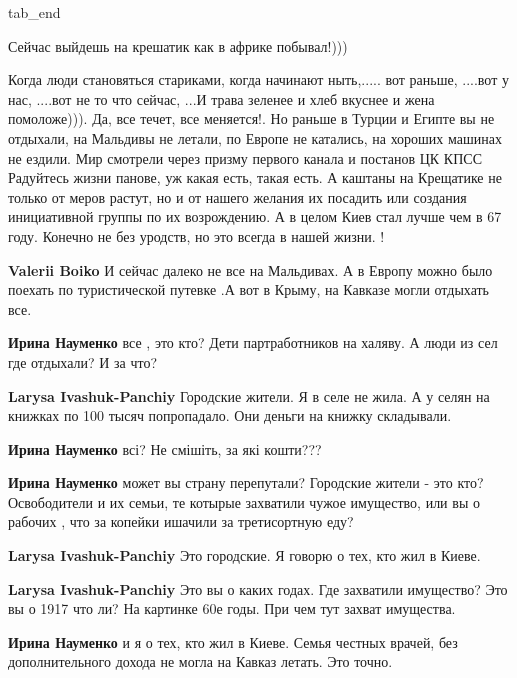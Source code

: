 \begin{itemize}
  tab_end
\fi

Сейчас выйдешь на крешатик как в африке побывал!)))


Когда люди становяться стариками, когда начинают ныть,..... вот раньше, ....вот
у нас, ....вот не то что сейчас, ...И трава зеленее и хлеб вкуснее и жена
помоложе))). Да, все течет, все меняется!. Но раньше в Турции и Египте вы не
отдыхали, на Мальдивы не летали, по Европе не катались, на хороших машинах не
ездили. Мир смотрели через призму первого канала и постанов ЦК КПСС Радуйтесь
жизни панове, уж какая есть, такая есть. А каштаны на Крещатике не только от
меров растут, но и от нашего желания их посадить или создания инициативной
группы по их возрождению. А в целом Киев стал лучше чем в 67 году. Конечно не
без уродств, но это всегда в нашей жизни. !

\begin{itemize} %
\textbf{Valerii Boiko} И сейчас далеко не все на Мальдивах. А в Европу можно было поехать по туристической путевке .А вот в Крыму, на Кавказе могли отдыхать все.

\begin{itemize} %
\textbf{Ирина Науменко} все , это кто? Дети партработников на халяву. А люди из сел где отдыхали? И за что?

\textbf{Larysa Ivashuk-Panchiy} Городские жители. Я в селе не жила. А у селян на книжках по 100 тысяч попропадало. Они деньги на книжку складывали.

\textbf{Ирина Науменко} всі? Не смішіть, за які кошти???

\textbf{Ирина Науменко} может вы страну перепутали? Городские жители - это кто? Освободители и их семьи, те котырые захватили чужое имущество, или вы о рабочих , что за копейки ишачили за третисортную еду?

\textbf{Larysa Ivashuk-Panchiy} Это городские. Я говорю о тех, кто жил в Киеве.

\textbf{Larysa Ivashuk-Panchiy} Это вы о каких годах. Где захватили имущество? Это вы о 1917 что ли? На картинке 60е годы. При чем тут захват имущества.

\textbf{Ирина Науменко} и я о тех, кто жил в Киеве. Семья честных врачей, без дополнительного дохода не могла на Кавказ летать. Это точно.


\end{itemize}
\end{itemize}
\end{itemize}
